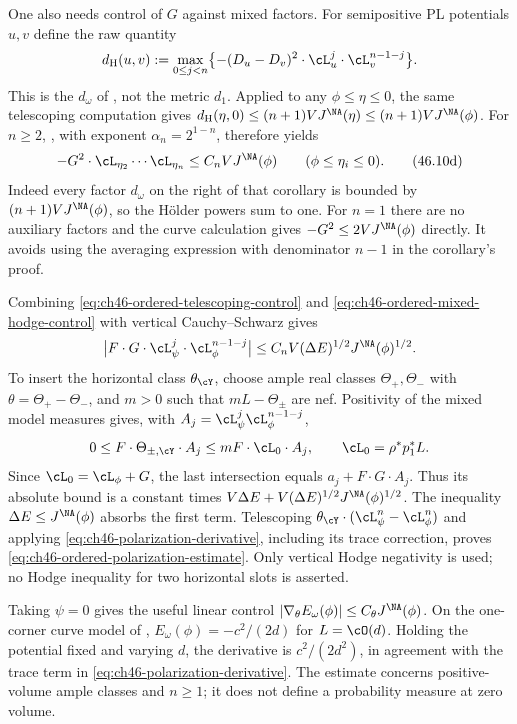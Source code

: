 One also needs control of $G$ against mixed factors. For semipositive
PL potentials $u,v$ define the raw quantity
\[
 d_{\mathrm H}(u,v)
   :=\max_{0\leq j<n}
       \bigl\{-(D_u-D_v)^2\cdot\cL_u^j\cdot\cL_v^{n-1-j}\bigr\}.
\]
This is the $d_\omega$ of \cite[Definition~3.29]{BJ22},
not the metric $d_1$. Applied to any $\phi\leq\eta\leq0$,
the same telescoping computation gives
$d_{\mathrm H}(\eta,0)\leq(n+1)VJ^{\NA}(\eta)
\leq(n+1)VJ^{\NA}(\phi)$.
For $n\geq2$, \cite[Corollary~3.34]{BJ22}, with exponent
$\alpha_n=2^{1-n}$, therefore yields
\[
 -G^2\cdot\cL_{\eta_2}\cdots\cL_{\eta_n}
       \leq C_n VJ^{\NA}(\phi)
       \qquad(\phi\leq\eta_i\leq0).
\tag{46.10d}\label{eq:ch46-ordered-mixed-hodge-control}
\]
Indeed every factor $d_\omega$ on the right of that corollary is
bounded by $(n+1)VJ^{\NA}(\phi)$, so the H\"older powers sum to one.
For $n=1$ there are no auxiliary factors and the curve calculation
gives $-G^2\leq2VJ^{\NA}(\phi)$ directly. It avoids using the
averaging expression with denominator $n-1$ in the corollary's proof.

Combining \eqref{eq:ch46-ordered-telescoping-control} and
\eqref{eq:ch46-ordered-mixed-hodge-control} with vertical
Cauchy--Schwarz gives
\[
 \bigl|F\cdot G\cdot\cL_\psi^j\cdot\cL_\phi^{n-1-j}\bigr|
       \leq C_n V(\Delta E)^{1/2}J^{\NA}(\phi)^{1/2}.
\]
To insert the horizontal class $\theta_{\cY}$, choose ample real
classes $\Theta_+,\Theta_-$ with $\theta=\Theta_+-\Theta_-$,
and $m>0$ such that $mL-\Theta_\pm$ are nef.
Positivity of the mixed model measures gives, with
$A_j=\cL_\psi^j\cL_\phi^{n-1-j}$,
\[
 0\leq F\cdot\Theta_{\pm,\cY}\cdot A_j
       \leq mF\cdot\cL_0\cdot A_j,
 \qquad \cL_0=\rho^*p_1^*L.
\]
Since $\cL_0=\cL_\phi+G$, the last intersection equals
$a_j+F\cdot G\cdot A_j$.
Thus its absolute bound is a constant times
$V\Delta E+V(\Delta E)^{1/2}J^{\NA}(\phi)^{1/2}$.
The inequality $\Delta E\leq J^{\NA}(\phi)$ absorbs the first term.
Telescoping $\theta_{\cY}\cdot(\cL_\psi^n-\cL_\phi^n)$
and applying \eqref{eq:ch46-polarization-derivative}, including
its trace correction, proves
\eqref{eq:ch46-ordered-polarization-estimate}.
Only vertical Hodge negativity is used; no Hodge inequality for two
horizontal slots is asserted.

Taking $\psi=0$ gives the useful linear control
$|\nabla_\theta E_\omega(\phi)|\leq C_\theta J^{\NA}(\phi)$.
On the one-corner curve model of , $E_\omega(\phi)=-c^2/(2d)$
for $L=\cO(d)$. Holding the potential fixed and varying $d$,
the derivative is $c^2/(2d^2)$, in agreement with the trace term in
\eqref{eq:ch46-polarization-derivative}.
The estimate concerns positive-volume ample classes and $n\geq1$;
it does not define a probability measure at zero volume.

